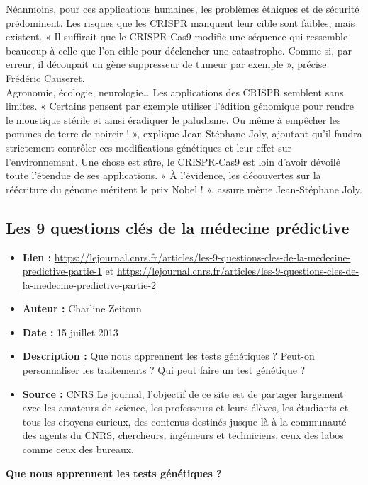 \documentclass[8pt]{article}
\begin{document}
Néanmoins, pour ces applications humaines, les problèmes éthiques et de sécurité prédominent. Les risques que les CRISPR manquent leur cible sont faibles, mais existent. « Il suffirait que le CRISPR-Cas9 modifie une séquence qui ressemble beaucoup à celle que l’on cible pour déclencher une catastrophe. Comme si, par erreur, il découpait un gène suppresseur de tumeur par exemple », précise Frédéric Causeret.  \\

Agronomie, écologie, neurologie… Les applications des CRISPR semblent sans limites. « Certains pensent par exemple utiliser l’édition génomique pour rendre le moustique stérile et ainsi éradiquer le paludisme. Ou même à empêcher les pommes de terre de noircir ! », explique Jean-Stéphane Joly, ajoutant qu’il faudra strictement contrôler ces modifications génétiques et leur effet sur l’environnement. Une chose est sûre, le CRISPR-Cas9 est loin d’avoir dévoilé toute l’étendue de ses applications. « À l’évidence, les découvertes sur la réécriture du génome méritent le prix Nobel ! », assure même Jean-Stéphane Joly.

\newpage
\subsection{Les 9 questions clés de la médecine prédictive }
\begin{itemize}
	\item \textbf{Lien : }  \url{https://lejournal.cnrs.fr/articles/les-9-questions-cles-de-la-medecine-predictive-partie-1} et \url{https://lejournal.cnrs.fr/articles/les-9-questions-cles-de-la-medecine-predictive-partie-2} 
	\item \textbf{Auteur : } Charline Zeitoun
	\item \textbf{Date : } 15 juillet 2013
	\item \textbf{Description : } Que nous apprennent les tests génétiques ? Peut-on personnaliser les traitements ? Qui peut faire un test génétique ? 
	\item \textbf{Source : } CNRS Le journal, l'objectif de ce site est de partager largement avec les amateurs de science, les professeurs et leurs élèves, les étudiants et tous les citoyens curieux, des contenus destinés jusque-là à la communauté des agents du CNRS, chercheurs, ingénieurs et techniciens, ceux des labos comme ceux des bureaux.
\end{itemize}

\textbf{Que nous apprennent les tests génétiques ?}
\end{document}
